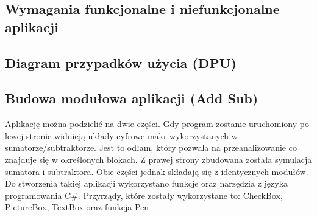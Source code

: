\documentclass[12pt, a4paper, onside, polish]{article}				%
\begin{document}
\subsection{Wymagania funkcjonalne i niefunkcjonalne aplikacji}
\cleardoublepage

\subsection{Diagram przypadków użycia (DPU)}
\cleardoublepage

\subsection{Budowa modułowa aplikacji (Add Sub)}
\hspace{\parindent}
Aplikację można podzielić na dwie części. Gdy program zostanie uruchomiony po lewej stronie widnieją układy cyfrowe makr wykorzystanych w sumatorze/subtraktorze. Jest to odłam, który pozwala na przeanalizowanie co znajduje się w określonych blokach. Z prawej strony zbudowana została symulacja sumatora i subtraktora. Obie części jednak składają się z identycznych modułów. Do stworzenia takiej aplikacji wykorzystano funkcje oraz narzędzia z języka programowania C\#. Przyrządy, które zostały wykorzystane to: CheckBox, PictureBox, TextBox oraz funkcja Pen  \newline\newline
\end{document}
